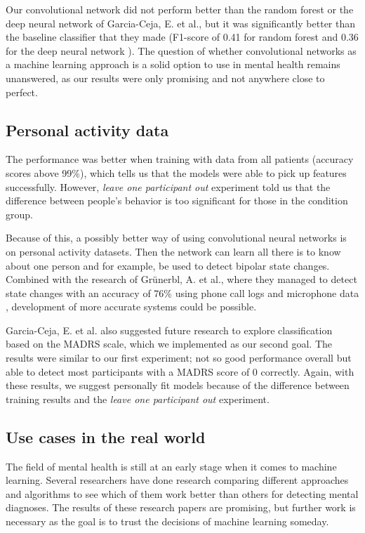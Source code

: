 Our convolutional network did not perform better than the random forest or the deep neural network of Garcia-Ceja, E. et al., but it was significantly better than the baseline classifier that they made (F1-score of 0.41 for random forest and 0.36 for the deep neural network \cite{GarciaCeja2018_classification_bipolar}). The question of whether convolutional networks as a machine learning approach is a solid option to use in mental health remains unanswered, as our results were only promising and not anywhere close to perfect. 

\subsection{Personal activity data}
The performance was better when training with data from all patients (accuracy scores above 99\%), which tells us that the models were able to pick up features successfully. However, \textit{leave one participant out} experiment told us that the difference between people's behavior is too significant for those in the condition group. 

Because of this, a possibly better way of using convolutional neural networks is on personal activity datasets. Then the network can learn all there is to know about one person and for example, be used to detect bipolar state changes. Combined with the research of Grünerbl, A. et al., where they managed to detect state changes with an accuracy of 76\% using phone call logs and microphone data \cite{grunerbl_smartphone_bipolar}, development of more accurate systems could be possible.

Garcia-Ceja, E. et al. also suggested future research to explore classification based on the MADRS scale, which we implemented as our second goal. The results were similar to our first experiment; not so good performance overall but able to detect most participants with a MADRS score of 0 correctly. Again, with these results, we suggest personally fit models because of the difference between training results and the \textit{leave one participant out} experiment.

\subsection{Use cases in the real world}

The field of mental health is still at an early stage when it comes to machine learning. Several researchers have done research comparing different approaches and algorithms to see which of them work better than others for detecting mental diagnoses. The results of these research papers are promising, but further work is necessary as the goal is to trust the decisions of machine learning someday. 


